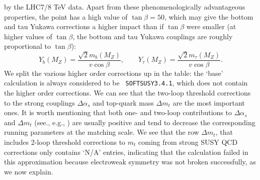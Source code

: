 \documentclass[final,3p,times,pdflatex]{elsarticle}
\begin{document}
by the LHC7/8 TeV data. Apart from these phenomenologically advantageous
properties, the point has a high value of $\tan \beta=50$, which may give the 
bottom and tau Yukawa corrections a higher impact than if $\tan \beta$ were
smaller (at higher values of $\tan \beta$, the bottom and tau Yukawa couplings
are roughly proportional to $\tan \beta$):
\begin{equation}
Y_b(M_Z) = \frac{\sqrt{2}m_b(M_Z)}{v \cos \beta}, \qquad
Y_\tau(M_Z) = \frac{\sqrt{2}m_\tau(M_Z)}{v \cos \beta}.
\end{equation}
We split the various higher order corrections up in
the table: the `base' calculation is always considered to be {\tt
  SOFTSUSY3.4.1}, which does not contain the higher order corrections. 
We can see that the two-loop threshold corrections to the strong couplings $\Delta \alpha_s$ and top-quark mass $\Delta m_t$ are the most important ones. 
It is worth mentioning that both  one- and two-loop contributions to $\Delta \alpha_s$ and $\Delta m_t$ (see., e.g., \cite{Pierce:1996zz,Bednyakov:2010ni}) are usually positive and tend to decrease the corresponding running parameters at the matching scale. 
We see that the row $\Delta m_t$, that includes 2-loop threshold corrections
to $m_t$ coming from strong SUSY QCD corrections only contains `N/A' entries,
indicating that the calculation failed in this approximation because
electroweak symmetry was not broken successfully, as we now explain. 
\end{document}
